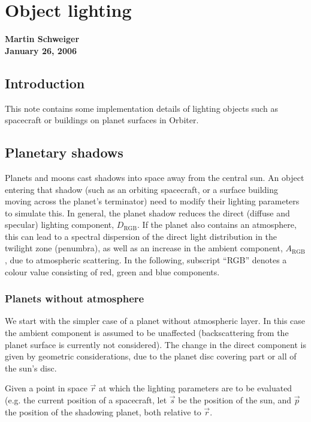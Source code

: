 \documentclass[Orbiter Technical Reference.tex]{subfiles}
\begin{document}
\section{Object lighting}
\textbf{Martin Schweiger}\\
\textbf{January 26, 2006}


\subsection{Introduction}
This note contains some implementation details of lighting objects such as spacecraft or buildings on planet surfaces in Orbiter.

\subsection{Planetary shadows}
Planets and moons cast shadows into space away from the central sun. An object entering that shadow (such as an orbiting spacecraft, or a surface building moving across the planet's terminator) need to modify their lighting parameters to simulate this. In general, the planet shadow reduces the direct (diffuse and specular) lighting component, $D_\text{RGB}$. If the planet also contains an atmosphere, this can lead to a spectral dispersion of the direct light distribution in the twilight zone (penumbra), as well as an increase in the ambient component, $A_\text{RGB}$, due to atmospheric scattering. In the following, subscript ``RGB'' denotes a colour value consisting of red, green and blue components.

\subsubsection{Planets without atmosphere}
We start with the simpler case of a planet without atmospheric layer. In this case the ambient component is assumed to be unaffected (backscattering from the planet surface is currently not considered). The change in the direct component is given by geometric considerations, due to the planet disc covering part or all of the sun's disc.

Given a point in space $\vec{r}$ at which the lighting parameters are to be evaluated (e.g. the current position of a spacecraft, let $\vec{s}$ be the position of the sun, and $\vec{p}$ the position of the shadowing planet, both relative to $\vec{r}$.
\end{document}
